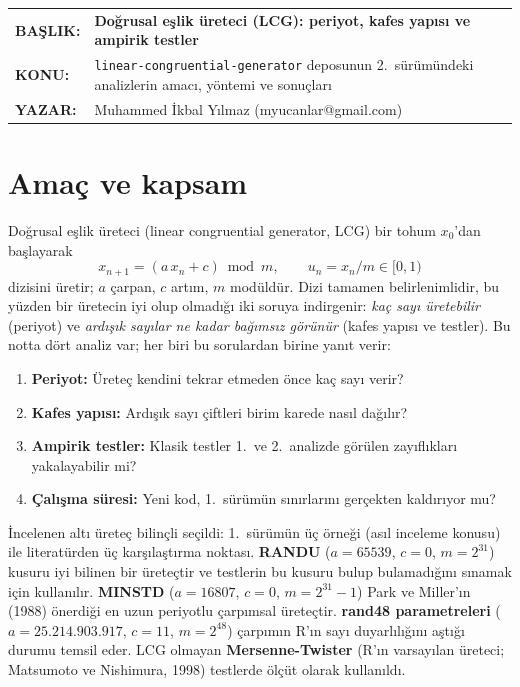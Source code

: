\documentclass[11pt,a4paper]{article}
\begin{document}
\vspace*{14pt}
\begin{tabular}{@{}p{2.35cm}@{}p{\dimexpr\textwidth-2.35cm}@{}}
\textbf{BAŞLIK:} & \textbf{\large Doğrusal eşlik üreteci (LCG): periyot, kafes yapısı ve ampirik testler}\\[3pt]
\textbf{KONU:} & \texttt{linear-congruential-generator} deposunun 2.\ sürümündeki analizlerin amacı, yöntemi ve sonuçları\\[3pt]
\textbf{YAZAR:} & Muhammed İkbal Yılmaz (myucanlar@gmail.com)
\end{tabular}

\vspace{8pt}
\vspace{12pt}

\section{Amaç ve kapsam}

Doğrusal eşlik üreteci (linear congruential generator, LCG) bir tohum $x_0$'dan başlayarak
\[
  x_{n+1} = (a\,x_n + c) \bmod m, \qquad u_n = x_n/m \in [0,1)
\]
dizisini üretir; $a$ çarpan, $c$ artım, $m$ modüldür. Dizi tamamen belirlenimlidir, bu yüzden bir üretecin iyi olup olmadığı
iki soruya indirgenir: \emph{kaç sayı üretebilir} (periyot) ve \emph{ardışık sayılar ne kadar bağımsız görünür} (kafes yapısı
ve testler). Bu notta dört analiz var; her biri bu sorulardan birine yanıt verir:

\begin{enumerate}
  \item \textbf{Periyot:} Üreteç kendini tekrar etmeden önce kaç sayı verir?
  \item \textbf{Kafes yapısı:} Ardışık sayı çiftleri birim karede nasıl dağılır?
  \item \textbf{Ampirik testler:} Klasik testler 1.\ ve 2.\ analizde görülen zayıflıkları yakalayabilir mi?
  \item \textbf{Çalışma süresi:} Yeni kod, 1.\ sürümün sınırlarını gerçekten kaldırıyor mu?
\end{enumerate}

İncelenen altı üreteç bilinçli seçildi: 1.\ sürümün üç örneği (asıl inceleme konusu) ile literatürden üç karşılaştırma noktası.
\textbf{RANDU} ($a=65539$, $c=0$, $m=2^{31}$) kusuru iyi bilinen bir üreteçtir ve testlerin bu kusuru bulup bulamadığını sınamak
için kullanılır. \textbf{MINSTD} ($a=16807$, $c=0$, $m=2^{31}-1$) Park ve Miller'ın (1988) önerdiği en uzun periyotlu çarpımsal
üreteçtir. \textbf{rand48 parametreleri} ($a=25.214.903.917$, $c=11$, $m=2^{48}$) çarpımın R'ın sayı duyarlılığını aştığı durumu
temsil eder. LCG olmayan \textbf{Mersenne-Twister} (R'ın varsayılan üreteci; Matsumoto ve Nishimura, 1998) testlerde ölçüt olarak
kullanıldı.
\end{document}
